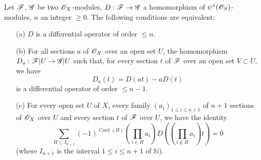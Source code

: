 \begin{proposition}[16.8.8]
\label{IV.16.8.8}
Let $\mathscr{F}$, $\mathscr{G}$ be two $\mathscr{O}_X$-modules, $D: \sh{F} \to \sh{G}$ a homomorphism of $\psi^*(\mathscr{O}_S)$-modules, $n$ an integer $\geq 0$.
The following conditions are equivalent:
\begin{enumerate}
  \item[(a)] $D$ is a differential operator of order $\leq n$.
  \item[(b)] For all sections $a$ of $\mathscr{O}_X$ over an open set $U$, the homomorphism $D_a: \sh{F}|U \to \sh{G}|U$ such that, for every section $t$ of $\mathscr{F}$ over an open set $V \subset U$, we have
  \[  
    \label{IV.16.8.8.1}
    D_a(t) = D(at) - a D(t)
    \tag{16.8.8.1}
  \]
  is a differential operator of order $\leq n-1$.
  \item[(c)] For every open set $U$ of $X$, every family $(a_i)_{1 \leq i \leq n+1}$ of $n+1$ sections of $\mathscr{O}_X$ over $U$ and every section $t$ of $\mathscr{F}$ over $U$, we have the identity
  \[
    \label{IV.16.8.8.2}
    \sum_{H \subset I_{n+1}} (-1)^{\operatorname{Card}(H)} (\prod_{i \in H} a_i) D ((\prod_{i \notin H} a_i ) t ) = 0
    \tag{16.8.8.2}
  \]
  (where $I_{n+1}$ is the interval $1 \leq i \leq n+1$ of $\mathbb{N}$).
\end{enumerate}
\end{proposition}

